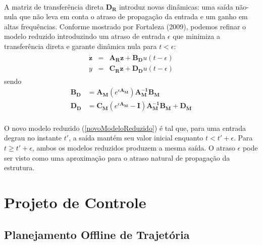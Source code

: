\documentclass[a4paper,11pt]{scrartcl} %
\numberwithin{equation}{section} %
\numberwithin{figure}{section} %
\numberwithin{table}{section} %
\begin{document}
\paragraph{} A matriz de transferência direta $\mathbf{D_R}$ introduz novas dinâmicas: uma saída não-nula que não leva em conta o atraso de propagação da entrada e um ganho em altas frequências. Conforme mostrado por Fortaleza (2009), podemos refinar o modelo reduzido introduzindo um atraso de entrada $\epsilon$ que minimiza a transferência direta e garante dinâmica nula para $t < \epsilon$: \begin{align}
\begin{array}{lll}
	\mathbf{\dot{z}} &=& \mathbf{A_R}\mathbf{z}+\mathbf{B_D}u(t-\epsilon)\\
	y &=& \mathbf{C_R}\mathbf{z}+\mathbf{D_D}u(t-\epsilon) \label{novoModeloReduzido}
\end{array}
\end{align} sendo \begin{align}
	\mathbf{B_D} &= \mathbf{A_M}\left(e^{\epsilon\mathbf{A_M}}\right)\mathbf{A_M^{-1}}\mathbf{B_M}\\
	\mathbf{D_D} &= \mathbf{C_M}\left(e^{\epsilon\mathbf{A_M}} - \mathbf{I}\right)\mathbf{A_M^{-1}}\mathbf{B_M} + \mathbf{D_M}
\end{align}

\paragraph{} O novo modelo reduzido (\ref{novoModeloReduzido}) é tal que, para uma entrada degrau no instante $t'$, a saída mantém seu valor inicial enquanto $t < t' + \epsilon$. Para $t \ge t' + \epsilon$, ambos os modelos reduzidos produzem a mesma saída. O atraso $\epsilon$ pode ser visto como uma aproximação para o atraso natural de propagação da estrutura.


\section{Projeto de Controle}
\subsection{Planejamento Offline de Trajetória}
\end{document}
